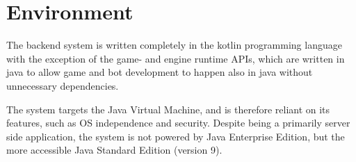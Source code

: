 




%

\chapter{Environment}\label{sect:Environment}

The backend system is written completely in the kotlin programming language with the exception of the game- and engine runtime APIs, which are written in java to allow game and bot development to happen also in java without unnecessary dependencies.

The system targets the Java Virtual Machine, and is therefore reliant on its features, such as OS independence and security. Despite being a primarily server side application, the system is not powered by Java Enterprise Edition, but the more accessible Java Standard Edition (version 9).

